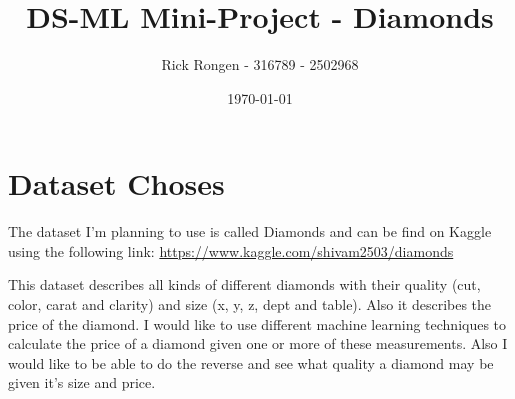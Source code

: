 \documentclass{scrreprt}
\author{Rick Rongen - 316789 - 2502968}
\title{DS-ML Mini-Project - Diamonds}
\date{\today}
\begin{document}
	\maketitle
	\chapter{Dataset Choses}
		The dataset I'm planning to use is called Diamonds and can be find on Kaggle using the following link: \url{https://www.kaggle.com/shivam2503/diamonds}\par
		
		This dataset describes all kinds of different diamonds with their quality (cut, color, carat and clarity) and size (x, y, z, dept and table). Also it describes the price of the diamond. I would like to use different machine learning techniques to calculate the price of a diamond given one or more of these measurements. Also I would like to be able to do the reverse and see what quality a diamond may be given it's size and price.
		
\end{document}
